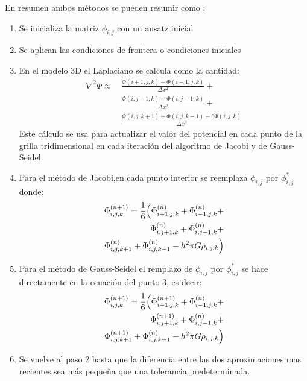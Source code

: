 \documentclass[reprint,amsmath,amssymb,aps]{revtex4-2}
\begin{document}
En resumen ambos métodos se pueden resumir como \cite{laplacian}:
\begin{enumerate}
    \item Se inicializa la matriz $\phi_{i,j}$ con un ansatz inicial
    \item Se aplican las condiciones de frontera o condiciones iniciales
     \item En el modelo 3D el Laplaciano se calcula como la cantidad:
    \begin{equation}
    \begin{split}
    \nabla^2 \Phi \approx \, & \frac{\Phi(i+1, j, k) + \Phi(i-1, j, k)}{\Delta x^2} + \\
                         & \frac{\Phi(i, j+1, k) + \Phi(i, j-1, k)}{\Delta x^2} + \\
                         & \frac{\Phi(i, j, k+1) + \Phi(i, j, k-1) - 6\Phi(i, j, k)}{\Delta x^2}
    \end{split}
    \end{equation}
    Este cálculo se usa para actualizar el valor del potencial en cada punto de la grilla tridimensional en cada iteración del algoritmo de Jacobi y de Gauss-Seidel
    \item Para el método de Jacobi,en cada punto interior se reemplaza $\phi_{i,j}$ por $\phi^*_{i,j}$ donde:
    \begin{equation}\label{Jacobi}
    \begin{split}
    \Phi_{i,j,k}^{(n+1)} = \frac{1}{6} \Bigl( \Phi_{i+1,j,k}^{(n)} + \Phi_{i-1,j,k}^{(n)} + \\
    \Phi_{i,j+1,k}^{(n)} + \Phi_{i,j-1,k}^{(n)} + \\ \Phi_{i,j,k+1}^{(n)} + \Phi_{i,j,k-1}^{(n)} - h^2 \pi G \rho_{i,j,k} \Bigr)
    \end{split}
    \end{equation}

    \item Para el método de Gauss-Seidel el remplazo de $\phi_{i,j}$ por $\phi^*_{i,j}$ se hace directamente en la ecuación del punto 3, es decir:
    \begin{equation}\label{Gauss}
    \begin{split}
        \Phi_{i,j,k}^{(n+1)} = \frac{1}{6} \Bigl( \Phi_{i+1,j,k}^{(n+1)} + \Phi_{i-1,j,k}^{(n)} + \\
    \Phi_{i,j+1,k}^{(n+1)} + \Phi_{i,j-1,k}^{(n)} + \\ \Phi_{i,j,k+1}^{(n+1)} + \Phi_{i,j,k-1}^{(n)} - h^2 \pi G \rho_{i,j,k} \Bigr)
    \end{split}
    \end{equation}
    
    \item Se vuelve al paso 2 hasta que la diferencia entre las dos aproximaciones mas recientes sea más pequeña que una tolerancia predeterminada.
\end{enumerate}
\end{document}
